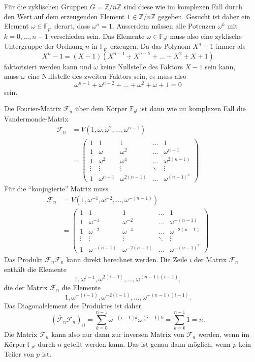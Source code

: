 Für die zyklischen Gruppen $G=\mathbb{Z}/n\mathbb{Z}$ sind diese wie
im komplexen Fall durch den Wert auf dem erzeugenden Element
$1\in\mathbb{Z}/n\mathbb{Z}$ gegeben.
Gesucht ist daher ein Element $\omega\in\mathbb{F}_{p^l}$ derart,
dass $\omega^n=1$.
Ausserdem müssen alle Potenzen $\omega^k$ mit $k=0,\dots,n-1$
verschieden sein.
Das Elemente $\omega\in\mathbb{F}_{p^l}$ muss also eine
zyklische Untergruppe der Ordnung $n$ in $\mathbb{F}_{p^l}$ 
erzeugen.
Da das Polynom $X^n-1$ immer als
\[
X^n-1
=
(X-1)(X^{n-1}+X^{n-2}+\dots+X^2+X+1)
\]
faktorisiert werden kann und $\omega$ keine Nullstelle des Faktors
$X-1$ sein kann, muss $\omega$ eine Nullstelle des zweiten Faktors sein,
es muss also
\begin{equation}
\omega^{n-1}+\omega^{n-2}+\dots+\omega^2 + \omega + 1 = 0
\label{buch:diskret:koerper:eqn:summeomega}
\end{equation}
sein.

Die Fourier-Matrix $\mathscr{F}_n$ über dem Körper $\mathbb{F}_{p^l}$
ist dann wie im komplexen Fall die Vandermonde-Matrix
\begin{align*}
\mathscr{F}_n
&=
V(1,\omega,\omega^2,\dots,\omega^{n-1})
\\
&=
\begin{pmatrix}
1&1&1&\dots&1\\
1&\omega&\omega^2&\dots&\omega^{n-1}\\
1&\omega^2&\omega^4&\dots&\omega^{2(n-1)}\\
\vdots&\vdots&\vdots&\ddots&\vdots\\
1&\omega^{n-1}&\omega^{2(n-1)}&\dots&\omega^{(n-1)^2}
\end{pmatrix}
\end{align*}
Für die ``konjugierte'' Matrix muss
\begin{align*}
\overline{\mathscr{F}}_n
&=
V(1,\omega^{-1},\omega^{-2},\dots,\omega^{-(n-1)})
\\
&=
\begin{pmatrix}
1&1&1&\dots&1\\
1&\omega^{-1}&\omega^{-2}&\dots&\omega^{-(n-1)}\\
1&\omega^{-2}&\omega^{-4}&\dots&\omega^{-2(n-1)}\\
\vdots&\vdots&\vdots&\ddots&\vdots\\
1&\omega^{-(n-1)}&\omega^{-2(n-1)}&\dots&\omega^{-(n-1)^2}
\end{pmatrix}
\end{align*}
Das Produkt $\overline{\mathscr{F}}_n\mathscr{F}_n$ kann direkt
berechnet werden.
Die Zeile $i$ der Matrix $\mathscr{F}_n$ enthält die Elemente 
\[
1,\omega^{i-1},\omega^{2(i-1)},\dots,\omega^{(n-1)(i-1)},
\]
die der Matrix $\overline{\mathscr{F}}_n$ die Elemente
\[
1,\omega^{-(i-1)},\omega^{-2(i-1)},\dots,\omega^{-(n-1)(i-1)}.
\]
Das Diagonalelement des Produktes ist daher
\[
(\overline{\mathscr{F}}_n
\mathscr{F}_n)_{ii}
=
\sum_{k=0}^{n-1}
\omega^{-(i-1)k}\omega^{(i-1)k}
=
\sum_{k=0}^{n-1} 1
=
n.
\]
Die Matrix $\overline{\mathscr{F}}_n$ kann also nur dann zur
inversen Matrix von $\mathscr{F}_n$ werden, wenn im Körper
$\mathbb{F}_{p^l}$ durch $n$ geteilt werden kann.
Das ist genau dann möglich, wenn $p$ kein Teiler von $p$ ist.

